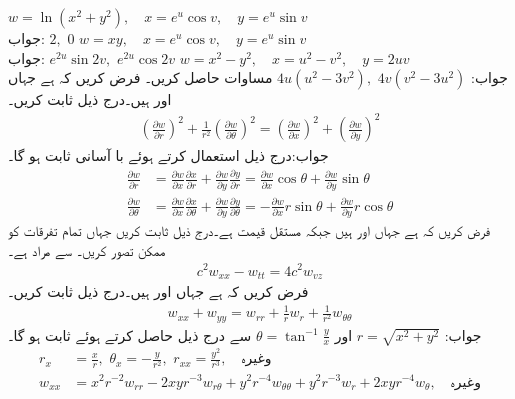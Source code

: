 \quad
$w=\ln(x^2+y^2),\quad x=e^u\cos v,\quad y=e^u\sin v$\\
جواب:
$2,\,\, 0$
\quad
$w=xy,\quad x=e^u\cos v,\quad y=e^u\sin v$\\
جواب:
$e^{2u}\sin 2v,\,\,e^{2u}\cos 2v$
\quad
$w=x^2-y^2,\quad x=u^2-v^2,\quad y=2uv$\\
جواب:
$4u(u^2-3v^2),\,\,4v(v^2-3u^2)$
مساوات  حاصل کریں۔
فرض کریں کہ  ہے جہاں  اور  ہیں۔درج ذیل ثابت کریں۔
\begin{align*}
\left(\frac{\partial w}{\partial r}\right)^2+\frac{1}{r^2}\left(\frac{\partial w}{\partial \theta}\right)^2=\left(\frac{\partial w}{\partial x}\right)^2+\left(\frac{\partial w}{\partial y}\right)^2
\end{align*}
جواب:درج ذیل استعمال کرتے ہوئے با آسانی ثابت ہو گا۔
\begin{align*}
\frac{\partial w}{\partial r}&=\frac{\partial w}{\partial x}\frac{\partial x}{\partial r}+\frac{\partial w}{\partial y}\frac{\partial y}{\partial r}=
\frac{\partial w}{\partial x}\cos \theta +\frac{\partial w}{\partial y}\sin \theta \\
\frac{\partial w}{\partial \theta}&=\frac{\partial w}{\partial x}\frac{\partial x}{\partial \theta}+\frac{\partial w}{\partial y}\frac{\partial y}{\partial \theta}=
-\frac{\partial w}{\partial x}r\sin \theta +\frac{\partial w}{\partial y}r\cos\theta 
\end{align*}
فرض کریں کہ ہے جہاں   اور   ہیں جبکہ   مستقل قیمت  ہے۔درج ذیل ثابت کریں جہاں تمام تفرقات کو ممکن تصور کریں۔  سے مراد  ہے۔
\begin{align*}
c^2w_{xx}-w_{tt}=4c^2w_{vz}
\end{align*} 
فرض کریں کہ  ہے جہاں  اور  ہیں۔درج ذیل ثابت کریں۔
\begin{align*}
w_{xx}+w_{yy}=w_{rr}+\frac{1}{r}w_r+\frac{1}{r^2}w_{\theta \theta}
\end{align*}
جواب:
$r=\sqrt{x^2+y^2}$
اور
$\theta=\tan^{-1}\frac{y}{x}$
سے درج ذیل حاصل کرتے ہوئے ثابت ہو گا۔
\begin{align*}
r_x&=\frac{x}{r},\,\, \theta_x=-\frac{y}{r^2},\,\, r_{xx}=\frac{y^2}{r^3},\quad \text{وغیرہ}\\
 w_{xx}&=x^2r^{-2}w_{rr}-2xyr^{-3}w_{r\theta}+y^2r^{-4}w_{\theta\theta}+y^2r^{-3}w_r+2xyr^{-4}w_{\theta},\quad \text{وغیرہ}
\end{align*}


